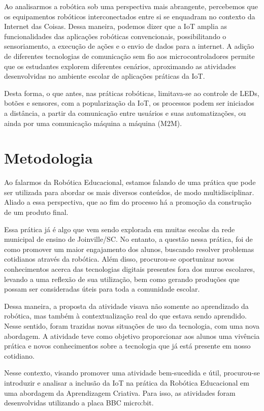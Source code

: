\documentclass[portuguese]{textolivre}
\begin{document}
Ao analisarmos a robótica sob uma perspectiva mais abrangente, percebemos que os equipamentos robóticos interconectados entre si se enquadram no contexto da Internet das Coisas. Dessa maneira, podemos dizer que a IoT amplia as funcionalidades das aplicações robóticas convencionais, possibilitando o sensoriamento, a execução de ações e o envio de dados para a internet. A adição de diferentes tecnologias de comunicação sem fio aos microcontroladores permite que os estudantes explorem diferentes cenários, aproximando as atividades desenvolvidas no ambiente escolar de aplicações práticas da IoT.

Desta forma, o que antes, nas práticas robóticas, limitava-se ao controle de LEDs, botões e sensores, com a popularização da IoT, os processos podem ser iniciados a distância, a partir da comunicação entre usuários e suas automatizações, ou ainda por uma comunicação máquina a máquina (M2M).

\section{Metodologia} \label{sec:fifth}

Ao falarmos da Robótica Educacional, estamos falando de uma prática que pode ser utilizada para abordar os mais diversos conteúdos, de modo multidisciplinar. Aliado a essa perspectiva, que ao fim do processo há a promoção da construção de um produto final.

Essa prática já é algo que vem sendo explorada em muitas escolas da rede municipal de ensino de Joinville/SC. No entanto, a questão nessa prática, foi de como promover um maior engajamento dos alunos, buscando resolver problemas cotidianos através da robótica. Além disso, procurou-se oportunizar novos conhecimentos acerca das tecnologias digitais presentes fora dos muros escolares, levando a uma reflexão de sua utilização, bem como gerando produções que possam ser consideradas úteis para toda a comunidade escolar.

Dessa maneira, a proposta da atividade visava não somente ao aprendizado da robótica, mas também à contextualização real do que estava sendo aprendido. Nesse sentido, foram trazidas novas situações de uso da tecnologia, com uma nova abordagem. A atividade teve como objetivo proporcionar aos alunos uma vivência prática e novos conhecimentos sobre a tecnologia que já está presente em nosso cotidiano.

Nesse contexto, visando promover uma atividade bem-sucedida e útil, procurou-se introduzir e analisar a inclusão da IoT na prática da Robótica Educacional em uma abordagem da Aprendizagem Criativa. Para isso, as atividades foram desenvolvidas utilizando a placa BBC micro:bit.
\end{document}
